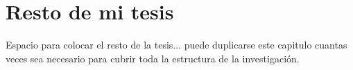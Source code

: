 \chapter{Resto de mi tesis}
\ifpdf
    \graphicspath{{Chapter2/Chapter2Figs/PNG/}{Chapter2/Chapter2Figs/PDF/}{Chapter2/Chapter2Figs/}}
\else
    \graphicspath{{Chapter2/Chapter2Figs/EPS/}{Chapter2/Chapter2Figs/}}
\fi

Espacio para colocar el resto de la tesis... puede duplicarse este capitulo cuantas veces sea necesario para cubrir toda la estructura de la investigación.



